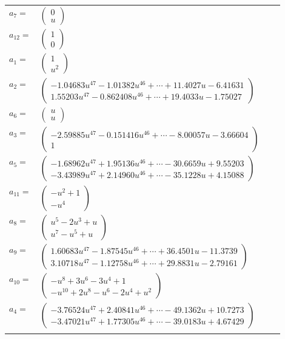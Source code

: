 \documentclass[1p]{elsarticle_modified}
\theoremstyle{definition}
\begin{document}
\begin{tabular}{m{7pt} m{180pt} m{7pt} m{180pt} }
\flushright $a_{7}=$&$\begin{pmatrix}0\\u\end{pmatrix}$ \\
\flushright $a_{12}=$&$\begin{pmatrix}1\\0\end{pmatrix}$ \\
\flushright $a_{1}=$&$\begin{pmatrix}1\\u^2\end{pmatrix}$ \\
\flushright $a_{2}=$&$\begin{pmatrix}-1.04683 u^{47}-1.01382 u^{46}+\cdots+11.4027 u-6.41631\\1.55203 u^{47}-0.862408 u^{46}+\cdots+19.4033 u-1.75027\end{pmatrix}$ \\
\flushright $a_{6}=$&$\begin{pmatrix}u\\u\end{pmatrix}$ \\
\flushright $a_{3}=$&$\begin{pmatrix}-2.59885 u^{47}-0.151416 u^{46}+\cdots-8.00057 u-3.66604\\1\end{pmatrix}$ \\
\flushright $a_{5}=$&$\begin{pmatrix}-1.68962 u^{47}+1.95136 u^{46}+\cdots-30.6659 u+9.55203\\-3.43989 u^{47}+2.14960 u^{46}+\cdots-35.1228 u+4.15088\end{pmatrix}$ \\
\flushright $a_{11}=$&$\begin{pmatrix}- u^2+1\\- u^4\end{pmatrix}$ \\
\flushright $a_{8}=$&$\begin{pmatrix}u^5-2 u^3+u\\u^7- u^5+u\end{pmatrix}$ \\
\flushright $a_{9}=$&$\begin{pmatrix}1.60683 u^{47}-1.87545 u^{46}+\cdots+36.4501 u-11.3739\\3.10718 u^{47}-1.12758 u^{46}+\cdots+29.8831 u-2.79161\end{pmatrix}$ \\
\flushright $a_{10}=$&$\begin{pmatrix}- u^8+3 u^6-3 u^4+1\\- u^{10}+2 u^8- u^6-2 u^4+u^2\end{pmatrix}$ \\
\flushright $a_{4}=$&$\begin{pmatrix}-3.76524 u^{47}+2.40841 u^{46}+\cdots-49.1362 u+10.7273\\-3.47021 u^{47}+1.77305 u^{46}+\cdots-39.0183 u+4.67429\end{pmatrix}$\\&\end{tabular}
\end{document}

